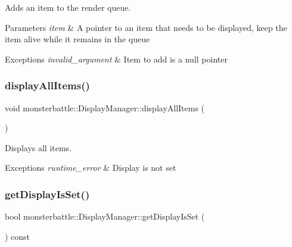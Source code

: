 Adds an item to the render queue. 


\begin{DoxyParams}{Parameters}
{\em item} & A pointer to an item that needs to be displayed, keep the item alive while it remains in the queue\\
\hline
\end{DoxyParams}

\begin{DoxyExceptions}{Exceptions}
{\em invalid\+\_\+argument} & Item to add is a null pointer \\
\hline
\end{DoxyExceptions}
\mbox{\label{classmonsterbattle_1_1DisplayManager_a10b2f43ee54c2fd07fcccafb776dd0b3}} 
\subsubsection{\texorpdfstring{display\+All\+Items()}{displayAllItems()}}
{\footnotesize\ttfamily void monsterbattle\+::\+Display\+Manager\+::display\+All\+Items (\begin{DoxyParamCaption}{ }\end{DoxyParamCaption})}



Displays all items. 


\begin{DoxyExceptions}{Exceptions}
{\em runtime\+\_\+error} & Display is not set \\
\hline
\end{DoxyExceptions}
\mbox{\label{classmonsterbattle_1_1DisplayManager_a93348ee551bbaa13a9450d39bcf73dfc}} 
\subsubsection{\texorpdfstring{get\+Display\+Is\+Set()}{getDisplayIsSet()}}
{\footnotesize\ttfamily bool monsterbattle\+::\+Display\+Manager\+::get\+Display\+Is\+Set (\begin{DoxyParamCaption}{ }\end{DoxyParamCaption}) const}



